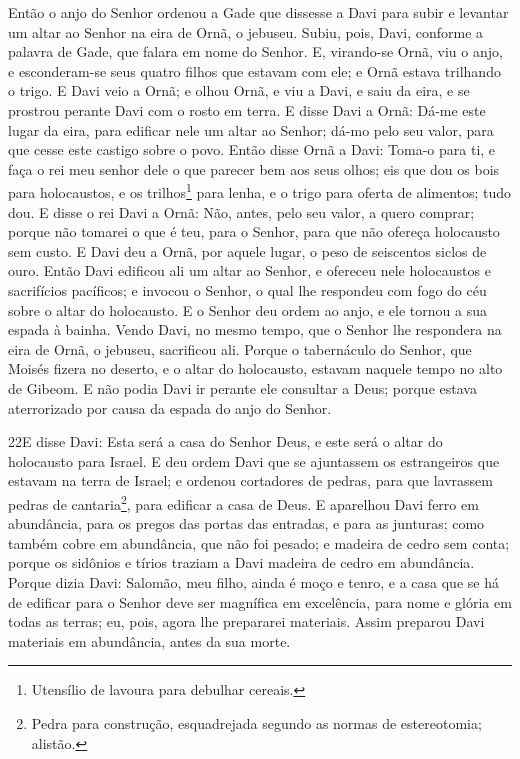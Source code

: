 Então o anjo do Senhor ordenou a Gade que dissesse a Davi para
subir e levantar um altar ao Senhor na eira de Ornã, o jebuseu.
Subiu, pois, Davi, conforme a palavra de Gade, que falara em
nome do Senhor. E, virando-se Ornã, viu o anjo, e
esconderam-se seus quatro filhos que estavam com ele; e Ornã estava
trilhando o trigo. E Davi veio a Ornã; e olhou Ornã, e viu a
Davi, e saiu da eira, e se prostrou perante Davi com o rosto em
terra. E disse Davi a Ornã: Dá-me este lugar da eira, para
edificar nele um altar ao Senhor; dá-mo pelo seu valor, para que
cesse este castigo sobre o povo. Então disse Ornã a Davi:
Toma-o para ti, e faça o rei meu senhor dele o que parecer bem aos
seus olhos; eis que dou os bois para holocaustos, e os
trilhos\footnote{Utensílio de lavoura para debulhar cereais.} para
lenha, e o trigo para oferta de alimentos; tudo dou. E disse
o rei Davi a Ornã: Não, antes, pelo seu valor, a quero comprar;
porque não tomarei o que é teu, para o Senhor, para que não ofereça
holocausto sem custo. E Davi deu a Ornã, por aquele lugar, o
peso de seiscentos siclos de ouro. Então Davi edificou ali um
altar ao Senhor, e ofereceu nele holocaustos e sacrifícios
pacíficos; e invocou o Senhor, o qual lhe respondeu com fogo do céu
sobre o altar do holocausto. E o Senhor deu ordem ao anjo, e
ele tornou a sua espada à bainha. Vendo Davi, no mesmo tempo,
que o Senhor lhe respondera na eira de Ornã, o jebuseu, sacrificou
ali. Porque o tabernáculo do Senhor, que Moisés fizera no
deserto, e o altar do holocausto, estavam naquele tempo no alto de
Gibeom. E não podia Davi ir perante ele consultar a Deus;
porque estava aterrorizado por causa da espada do anjo do Senhor.

\medskip

\lettrine{22} E disse Davi: Esta será a casa do Senhor Deus, e
este será o altar do holocausto para Israel. E deu ordem Davi
que se ajuntassem os estrangeiros que estavam na terra de Israel; e
ordenou cortadores de pedras, para que lavrassem pedras de
cantaria\footnote{Pedra para construção, esquadrejada segundo as
normas de estereotomia; alistão.}, para edificar a casa de Deus.
E aparelhou Davi ferro em abundância, para os pregos das portas
das entradas, e para as junturas; como também cobre em abundância,
que não foi pesado; e madeira de cedro sem conta; porque os
sidônios e tírios traziam a Davi madeira de cedro em abundância.
Porque dizia Davi: Salomão, meu filho, ainda é moço e tenro, e a
casa que se há de edificar para o Senhor deve ser magnífica em
excelência, para nome e glória em todas as terras; eu, pois, agora
lhe prepararei materiais. Assim preparou Davi materiais em
abundância, antes da sua morte.

